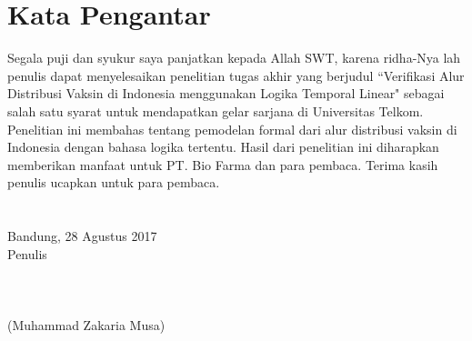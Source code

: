 \chapter*{Kata Pengantar}

Segala puji dan syukur saya panjatkan kepada Allah SWT, karena ridha-Nya lah penulis dapat menyelesaikan penelitian tugas akhir yang berjudul ``Verifikasi Alur Distribusi Vaksin di Indonesia menggunakan Logika Temporal Linear" sebagai salah satu syarat untuk mendapatkan gelar sarjana di Universitas Telkom. Penelitian ini membahas tentang pemodelan formal dari alur distribusi vaksin di Indonesia dengan bahasa logika tertentu. Hasil dari penelitian ini diharapkan memberikan manfaat untuk PT. Bio Farma dan para pembaca. Terima kasih penulis ucapkan untuk para pembaca.\\\\\\Bandung, 28 Agustus 2017
\\
Penulis
\\
\\
\\
\\
(Muhammad Zakaria Musa)